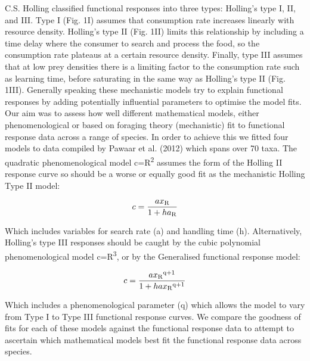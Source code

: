 \documentclass[11pt]{article}
\begin{document}
	C.S. Holling classified functional responses into three types: Holling's type I, II, and III. Type I (Fig. 1I) assumes that consumption rate increases linearly with resource density. Holling's type II (Fig. 1II) limits this relationship by including a time delay where the consumer to  search and process the food, so the consumption rate plateaus at a certain resource density. Finally, type III assumes that at low prey densities there is a limiting factor to the consumption rate such as learning time, before saturating in the same way as Holling's type II (Fig. 1III). Generally speaking these mechanistic models try to explain functional responses by adding potentially influential parameters to optimise the model fits. Our aim was to assess how well different mathematical models, either phenomenological or based on foraging theory (mechanistic) fit to functional response data across a range of species. In order to achieve this we fitted four models to data compiled by Pawaar et al. (2012) which spans over 70 taxa. The quadratic phenomenological model c=R\textsuperscript{2}
	assumes the form of the Holling II response curve so should be a worse or equally good fit as the mechanistic Holling Type II model: 
	
	$$c=\frac{ax\textsubscript{R}}{1+ha\textsubscript{R}}$$
	
	Which includes variables for search rate (a) and handling time (h). Alternatively, Holling's type III responses should be caught by the cubic polynomial phenomenological model c=R\textsuperscript{3}, or by the Generalised functional response model:

	$$c=\frac{ax\textsubscript{R}\textsuperscript{q+1}}{1 + hax\textsubscript{R}\textsuperscript{q+1}}$$
	
	Which includes a phenomenological parameter (q) which allows the model to vary from Type I to Type III functional response curves. We compare the goodness of fits for each of these models against the functional response data to attempt to ascertain which mathematical models best fit the functional response data across species. 
	
\end{document}
